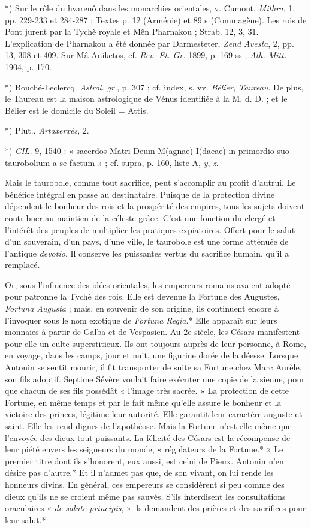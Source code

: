 \documentclass[a4paper, 11pt, oneside, polutonikogreek, french]{article}
\begin{document}
*) Sur le rôle du hvarenô dans les monarchies orientales, v. Cumont, \emph{Mithra}, 1, pp. 229-233 et 284-287 ; Textes p. 12 (Arménie) et 89 s (Commagène). Les rois de Pont jurent par la Tychè royale et Mên Pharnakou ; Strab. 12, 3, 31. L'explication de Pharnakou a été donnée par Darmesteter, \emph{Zend Avesta}, 2, pp. 13, 308 et 409. Sur Mâ Aniketos, cf. \emph{Rev. Et. Gr.} 1899, p. 169 ss ; \emph{Ath. Mitt.} 1904, p. 170.

*) Bouché-Leclercq. \emph{Astrol. gr.}, p. 307 ; cf. index, s. vv. \emph{Bélier, Taureau}. De plus, le Taureau est la maison astrologique de Vénus identifiée à la M. d. D. ; et le Bélier est le domicile du Soleil = Attis.

*) Plut., \emph{Artaxerxès}, 2.

*) \emph{CIL.} 9, 1540 : « sacerdos Matri Deum M(agnae) I(daeae) in primordio suo taurobolium a se factum » ; cf. supra, p. 160, liste A, \emph{y}, \emph{z}.

Mais le taurobole, comme tout sacrifice, peut s'accomplir au profit d'autrui. Le bénéfice intégral en passe au destinataire. Puisque de la protection divine dépendent le bonheur des rois et la prospérité des empires, tous les sujets doivent contribuer au maintien de la céleste grâce. C'est une fonction du clergé et l'intérêt des peuples de multiplier les pratiques expiatoires. Offert pour le salut d'un souverain, d'un pays, d'une ville, le taurobole est une forme atténuée de l'antique \emph{devotio}. Il conserve les puissantes vertus du sacrifice humain, qu'il a remplacé.

Or, sous l'influence des idées orientales, les empereurs romains avaient adopté pour patronne la Tychè des rois. Elle est devenue la Fortune des Augustes, \emph{Fortuna Augusta} ; mais, en souvenir de son origine, ils continuent encore à l'invoquer sous le nom exotique de \emph{Fortuna Regia}.* Elle apparaît sur leurs monnaies à partir de Galba et de Vespasien. Au 2e siècle, les Césars manifestent pour elle un culte superstitieux. Ils ont toujours auprès de leur personne, à Rome, en voyage, dans les camps, jour et nuit, une figurine dorée de la déesse. Lorsque Antonin se sentit mourir, il fit transporter de suite sa Fortune chez Marc Aurèle, son fils adoptif. Septime Sévère voulait faire exécuter une copie de la sienne, pour que chacun de ses fils possédât « l'image très sacrée. » La protection de cette Fortune, en même temps et par le fait même qu'elle assure le bonheur et la victoire des princes, légitime leur autorité. Elle garantit leur caractère auguste et saint. Elle les rend dignes de l'apothéose. Mais la Fortune n'est elle-même que l'envoyée des dieux tout-puissants. La félicité des Césars est la récompense de leur piété envers les seigneurs du monde, « régulateurs de la Fortune.* » Le premier titre dont ils s'honorent, eux aussi, est celui de Pieux. Antonin n'en désire pas d'autre.* Et il n'admet pas que, de son vivant, on lui rende les honneurs divins. En général, ces empereurs se considèrent si peu comme des dieux qu'ils ne se croient même pas sauvés. S'ils interdisent les consultations oraculaires « \emph{de salute principis}, » ils demandent des prières et des sacrifices pour leur salut.*
\end{document}
